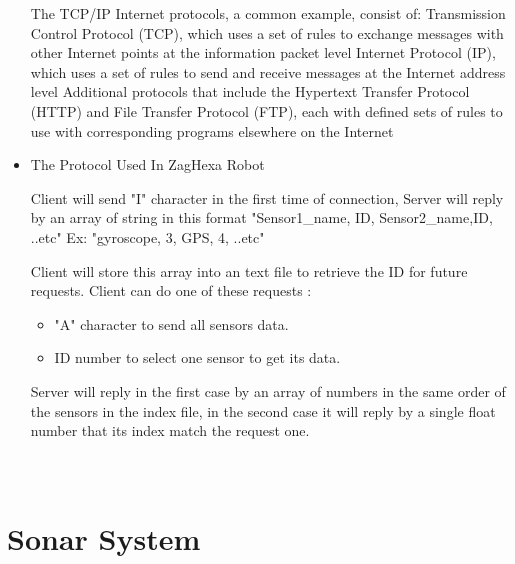 \begin{itemize}
			The TCP/IP Internet protocols, a common example, consist of:
			Transmission Control Protocol (TCP), which uses a set of rules to exchange messages with other Internet points at the information packet level
			Internet Protocol (IP), which uses a set of rules to send and receive messages at the Internet address level
			Additional protocols that include the Hypertext Transfer Protocol (HTTP) and File Transfer Protocol (FTP), each with defined sets of rules to use with corresponding programs elsewhere on the Internet
			
			\item The Protocol Used In ZagHexa Robot
			
			Client will send "I" character in the first time of connection, Server will reply by an array of string in this format {"Sensor1\_name, ID, Sensor2\_name,ID, ..etc"}
			Ex:	{"gyroscope, 3, GPS, 4, ..etc"}
			
			Client will store this array into an text file to retrieve the ID for future requests.
			Client can do one of these requests :
			\begin{itemize}
				\item "A" character  to send all sensors data.
				\item ID number to select one sensor to get its data.
			\end{itemize}
				
			Server will reply in the first case by an array of numbers in the same order of the sensors in the index file, in the second case it will reply by a single float number that its index match the request one.\\\\\\
			
		\end{itemize}


\section{Sonar System}
